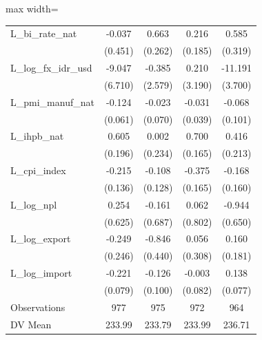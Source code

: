 \begin{table}[H]
\begin{adjustbox}{max width=\textwidth}
\begin{tabular}{l*{4}{c}}
L\_bi\_rate\_nat&      -0.037         &       0.663\sym{*}  &       0.216         &       0.585         \\
            &     (0.451)         &     (0.262)         &     (0.185)         &     (0.319)         \\
L\_log\_fx\_idr\_usd&      -9.047         &      -0.385         &       0.210         &     -11.191\sym{**} \\
            &     (6.710)         &     (2.579)         &     (3.190)         &     (3.700)         \\
L\_pmi\_manuf\_nat&      -0.124\sym{*}  &      -0.023         &      -0.031         &      -0.068         \\
            &     (0.061)         &     (0.070)         &     (0.039)         &     (0.101)         \\
L\_ihpb\_nat  &       0.605\sym{**} &       0.002         &       0.700\sym{***}&       0.416         \\
            &     (0.196)         &     (0.234)         &     (0.165)         &     (0.213)         \\
L\_cpi\_index &      -0.215         &      -0.108         &      -0.375\sym{*}  &      -0.168         \\
            &     (0.136)         &     (0.128)         &     (0.165)         &     (0.160)         \\
L\_log\_npl   &       0.254         &      -0.161         &       0.062         &      -0.944         \\
            &     (0.625)         &     (0.687)         &     (0.802)         &     (0.650)         \\
L\_log\_export&      -0.249         &      -0.846         &       0.056         &       0.160         \\
            &     (0.246)         &     (0.440)         &     (0.308)         &     (0.181)         \\
L\_log\_import&      -0.221\sym{**} &      -0.126         &      -0.003         &       0.138         \\
            &     (0.079)         &     (0.100)         &     (0.082)         &     (0.077)         \\
\midrule
Observations&         977         &         975         &         972         &         964         \\
DV Mean     &      233.99         &      233.79         &      233.99         &      236.71         \\

\end{tabular}
\end{adjustbox}
\end{table}
